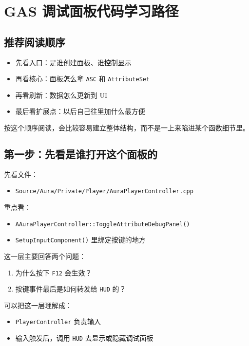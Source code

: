 \section{GAS 调试面板代码学习路径}

\subsection{推荐阅读顺序}
\begin{itemize}
	\item 先看入口：是谁创建面板、谁控制显示
	\item 再看核心：面板怎么拿 \texttt{ASC} 和 \texttt{AttributeSet}
	\item 再看刷新：数据怎么更新到 UI
	\item 最后看扩展点：以后自己往里加什么最方便
\end{itemize}

按这个顺序阅读，会比较容易建立整体结构，而不是一上来陷进某个函数细节里。

\subsection{第一步：先看是谁打开这个面板的}
先看文件：

\begin{itemize}
	\item \texttt{Source/Aura/Private/Player/AuraPlayerController.cpp}
\end{itemize}

重点看：
\begin{itemize}
	\item \texttt{AAuraPlayerController::ToggleAttributeDebugPanel()}
	\item \texttt{SetupInputComponent()} 里绑定按键的地方
\end{itemize}

这一层主要回答两个问题：
\begin{enumerate}
	\item 为什么按下 \texttt{F12} 会生效？
	\item 按键事件最后是如何转发给 \texttt{HUD} 的？
\end{enumerate}

可以把这一层理解成：

\begin{itemize}
	\item \texttt{PlayerController} 负责输入
	\item 输入触发后，调用 \texttt{HUD} 去显示或隐藏调试面板
\end{itemize}

